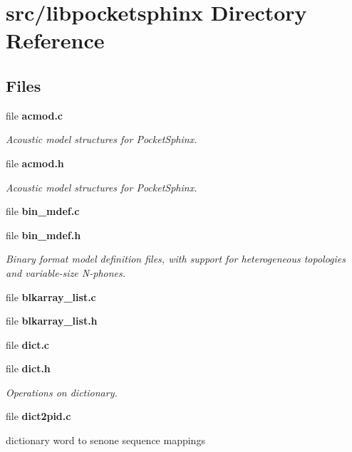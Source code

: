 \section{src/libpocketsphinx Directory Reference}
\label{dir_8d034a1e03e98d9b7ac467250bbebdea}
\subsection*{Files}
\begin{DoxyCompactItemize}
\item 
file {\bf acmod.\-c}
\begin{DoxyCompactList}\small\item\em Acoustic model structures for Pocket\-Sphinx. \end{DoxyCompactList}\item 
file {\bf acmod.\-h}
\begin{DoxyCompactList}\small\item\em Acoustic model structures for Pocket\-Sphinx. \end{DoxyCompactList}\item 
file {\bfseries bin\-\_\-mdef.\-c}
\item 
file {\bf bin\-\_\-mdef.\-h}
\begin{DoxyCompactList}\small\item\em Binary format model definition files, with support for heterogeneous topologies and variable-\/size N-\/phones. \end{DoxyCompactList}\item 
file {\bfseries blkarray\-\_\-list.\-c}
\item 
file {\bfseries blkarray\-\_\-list.\-h}
\item 
file {\bfseries dict.\-c}
\item 
file {\bf dict.\-h}
\begin{DoxyCompactList}\small\item\em Operations on dictionary. \end{DoxyCompactList}\item 
file {\bf dict2pid.\-c}
\begin{DoxyCompactList}\small\item\em 
\begin{DoxyItemize}
\item dictionary word to senone sequence mappings 
\end{DoxyItemize}\end{DoxyCompactList}\item 

\end{DoxyCompactItemize}
